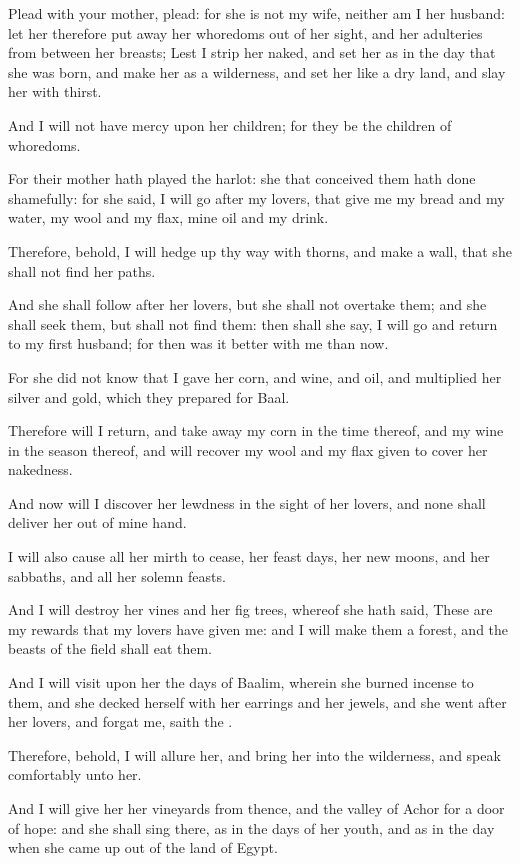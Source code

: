 \verse Plead with your mother, plead: for she is not my wife, neither am I her husband: let her therefore put away her whoredoms out of her sight, and her adulteries from between her breasts; \verse Lest I strip her naked, and set her as in the day that she was born, and make her as a wilderness, and set her like a dry land, and slay her with thirst.

\verse And I will not have mercy upon her children; for they be the children of whoredoms.

\verse For their mother hath played the harlot: she that conceived them hath done shamefully: for she said, I will go after my lovers, that give me my bread and my water, my wool and my flax, mine oil and my drink.

\verse Therefore, behold, I will hedge up thy way with thorns, and make a wall, that she shall not find her paths.

\verse And she shall follow after her lovers, but she shall not overtake them; and she shall seek them, but shall not find them: then shall she say, I will go and return to my first husband; for then was it better with me than now.

\verse For she did not know that I gave her corn, and wine, and oil, and multiplied her silver and gold, which they prepared for Baal.

\verse Therefore will I return, and take away my corn in the time thereof, and my wine in the season thereof, and will recover my wool and my flax given to cover her nakedness.

\verse And now will I discover her lewdness in the sight of her lovers, and none shall deliver her out of mine hand.

\verse I will also cause all her mirth to cease, her feast days, her new moons, and her sabbaths, and all her solemn feasts.

\verse And I will destroy her vines and her fig trees, whereof she hath said, These are my rewards that my lovers have given me: and I will make them a forest, and the beasts of the field shall eat them.

\verse And I will visit upon her the days of Baalim, wherein she burned incense to them, and she decked herself with her earrings and her jewels, and she went after her lovers, and forgat me, saith the \LORD.

\verse Therefore, behold, I will allure her, and bring her into the wilderness, and speak comfortably unto her.

\verse And I will give her her vineyards from thence, and the valley of Achor for a door of hope: and she shall sing there, as in the days of her youth, and as in the day when she came up out of the land of Egypt.

